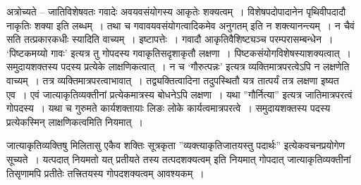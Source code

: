 अत्रोच्यते – जातिविशेषवतः गवादेः अवयवसंयोगस्य आकृतेः शक्यत्वम्~। विशेषपदोपादानेन पृथिवीपदादौ नाकृतिः शक्या इति लब्धम्~। तथा च गवावयवसंयोगत्वादिकमेव अनुगतम् इति न शक्त्यानन्त्यम्~। न चैवं सति तत्प्रकारकधीः स्यादिति वाच्यम्~। इष्टापत्तेः~। गवादौ आकृतिवैशिष्ट्यञ्च परम्परासम्बन्धेन~। ‘पिष्टकमय्यो गावः’ इत्यत्र तु गोपदस्य गवाकृतिसदृशाकृतौ लक्षणा~। पिष्टकसंयोगविशेषस्याशक्यत्वात्~। समुदायशक्तस्य पदस्य प्रत्येके लाक्षणिकत्वात्~। न च ‘गौरुत्पन्नः’ इत्यत्र व्यक्तिमात्रपरत्वेऽपि न लक्षणेति वाच्यम्~। तत्र व्यक्तिमात्रपरत्वाभावात्~। तद्व्यक्तित्वादिना तदुपस्थितौ यत्र तात्पर्यं तत्र लक्षणा इष्यत एव~।  एवं जात्याकृतिव्यक्तीनां प्रत्येकमात्रस्य बोधनेऽपि लक्षणा~।  यथा ”गौर्नित्या” इत्यत्र जातिमात्रपरत्वं गोपदस्य~।  यथा च गुरुमते कार्यशक्तायाः लिङः लोके  कार्यत्वमात्रपरत्वे~।  समुदायशक्तस्य पदस्य प्रत्येकस्मिन् लाक्षणिकत्वमिति नियमात्~। 

जात्याकृतिव्यक्तिषु मिलितासु एकैव शक्तिः सूत्रकृता ”व्यक्त्याकृतिजातयस्तु पदार्थः” इत्येकवचनप्रयोगेण सूच्यते~।  यत्पदात् नियमतो यत् प्रतीयते तस्य तत्पदशक्यत्वम् इति नियमात् गोपदात् जात्याकृतिव्यक्तीनां तिसृणामपि प्रतीतेः तत्त्रितयस्य गोपदशक्यत्वम् आवश्यकम्~। 

